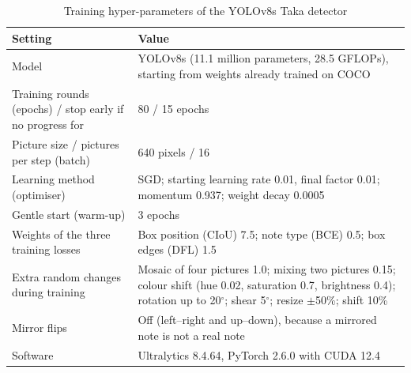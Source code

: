 \begin{table}[H]
\centering
\caption{Training hyper-parameters of the YOLOv8s Taka detector}
\label{tab:app_yolo}
\small
\begin{tabular}{|L{4.6cm}|L{10.0cm}|}
\hline
\textbf{Setting} & \textbf{Value} \\ \hline
Model & YOLOv8s (11.1 million parameters, 28.5 GFLOPs), starting from weights already trained on COCO \\ \hline
Training rounds (epochs) / stop early if no progress for & 80 / 15 epochs \\ \hline
Picture size / pictures per step (batch) & 640 pixels / 16 \\ \hline
Learning method (optimiser) & SGD; starting learning rate 0.01, final factor 0.01; momentum 0.937; weight decay 0.0005 \\ \hline
Gentle start (warm-up) & 3 epochs \\ \hline
Weights of the three training losses & Box position (CIoU) 7.5; note type (BCE) 0.5; box edges (DFL) 1.5 \\ \hline
Extra random changes during training & Mosaic of four pictures 1.0; mixing two pictures 0.15; colour shift (hue 0.02, saturation 0.7, brightness 0.4); rotation up to 20$^\circ$; shear 5$^\circ$; resize $\pm$50\%; shift 10\% \\ \hline
Mirror flips & Off (left--right and up--down), because a mirrored note is not a real note \\ \hline
Software & Ultralytics 8.4.64, PyTorch 2.6.0 with CUDA 12.4 \\ \hline
\end{tabular}
\end{table}

